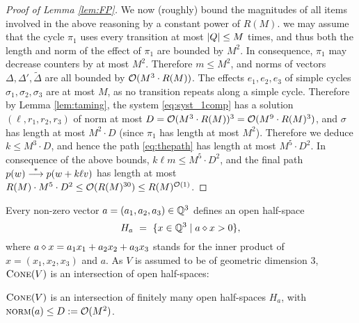 \begin{proof}[Proof of Lemma \ref{lem:FP}]
\smallskip

We now (roughly) bound the magnitudes of all items involved in the above reasoning
by a constant power of $R(M)$.
\Wlog we may assume that the cycle $\pi_1$ uses every transition at most $\left|Q\right|\leq M$ times,
and thus both the length and norm of the effect of $\pi_1$ are bounded by $M^2$.
In consequence, $\pi_1$ may decrease counters by at most $M^2$.
Therefore $m\leq M^2$, and
norms of vectors $\Delta, \Delta', \widetilde\Delta$ are all bounded by 
${\cal O}(M^3\cdot R(M))$. %
The effects $e_1, e_2, e_3$ of simple cycles $\sigma_1, \sigma_2, \sigma_3$ are at most $M$, 
as no transition repeats along a simple cycle.
Therefore by Lemma \ref{lem:taming}, the system \eqref{eq:syst_1comp} has a solution $(\ell, r_1, r_2, r_3)$ 
of norm at most $D={\cal O}(M^3\cdot R(M))^3 = {\cal O}(M^9 \cdot R(M)^{3})$, 
and $\sigma$ has length at most $M^2 \cdot D$
(since $\pi_1$ has length at most $M^2$). %
Therefore we deduce $k\leq M^3 \cdot D$, %
and hence
the path \eqref{eq:thepath} has length at most $M^5 \cdot D^2$. %
In consequence of the above bounds, $k \ell m \leq M^5 \cdot D^2$, %
and the final path $p(w) \stackrel{*}{\longrightarrow} p(w+ k \ell v)$ has length at most 
$R(M) \cdot M^5 \cdot D^2
\leq {\cal O}(R(M)^{30})\leq R(M)^{{\cal O}(1)}$.
\end{proof}




%
Every non-zero vector $a=(a_1, a_2, a_3)\in\mathbb{Q}^3$ defines an open half-space
\[
H_a \ = \ \{x\in\mathbb{Q}^3 \mid a \diamond x > 0\},
\]
where $a \diamond x = a_1 x_1 + a_2 x_2 + a_3 x_3$ stands for the inner product of 
$x =(x_1, x_2, x_3)$ and $a$.
As $V$ is assumed to be of geometric dimension 3,
$\textsc{Cone}(V)$  is an intersection of open half-spaces:
%
\begin{claim} \label{claim:a}
$\textsc{Cone}(V)$ is an intersection of %
finitely many open half-spaces $H_a$, with $\textsc{norm}(a) \leq D := {\cal O}(M^2)$.
\end{claim}
%

